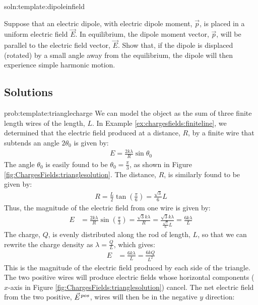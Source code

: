 \begin{problem}{soln:template:dipoleinfield}{\label{prob:template:dipoleinfield}}
	
Suppose that an electric dipole, with electric dipole moment, $\vec p$, is placed in a uniform electric field $\vec E$. In equilibrium, the dipole moment vector, $\vec p$, will be parallel to the electric field vector, $\vec E$. Show that, if the dipole is displaced (rotated) by a small angle away from the equilibrium, the dipole will then experience simple harmonic motion.
\end{problem}

\newpage
\subsection{Solutions}
\begin{solution}{prob:template:trianglecharge}\label{soln:template:trianglecharge}
We can model the object as the sum of three finite length wires of the length, $L$. In Example \ref{ex:chargesfields:finiteline}, we determined that the electric field produced at a distance, $R$, by a finite wire that subtends an angle $2\theta_0$ is given by:
\begin{align*}
E = \frac{2k\lambda}{R}\sin\theta_0
\end{align*}
The angle $\theta_0$ is easily found to be $\theta_0 = \frac{\pi}{3}$, as shown in Figure \ref{fig:ChargesFields:trianglesolution}. The distance, $R$, is similarly found to be given by:
\begin{align*}
R = \frac{L}{2}\tan\left(\frac{\pi}{6}\right)=\frac{\sqrt{3}}{6}L
\end{align*}
Thus, the magnitude of the electric field from one wire is given by:
\begin{align*}
E&= \frac{2k\lambda}{R}\sin\left(\frac{\pi}{3}\right)=\frac{\sqrt{3}k\lambda}{R}=\frac{\sqrt{3}k\lambda}{\frac{\sqrt{3}}{6}L}=\frac{6k\lambda}{L}
\end{align*}
The charge, $Q$, is evenly distributed along the rod of length, $L$, so that we can rewrite the charge density as $\lambda=\frac{Q}{L}$, which gives:
\begin{align*}
E &= \frac{6k\lambda}{L} = \frac{6kQ}{L^2}
\end{align*}
This is the magnitude of the electric field produced by each side of the triangle. The two positive wires will produce electric fields whose horizontal components ($x$-axis in Figure \ref{fig:ChargesFields:trianglesolution}) cancel. The net electric field from the two positive, $\pvec E^{pos}$, wires will then be in the negative $y$ direction:

\end{solution}

